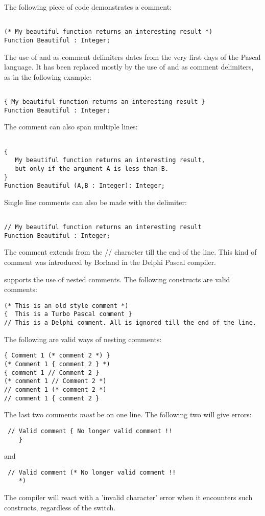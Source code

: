 The following piece of code demonstrates a comment:
\begin{verbatim}

(* My beautiful function returns an interesting result *) 
Function Beautiful : Integer;

\end{verbatim}
The use of \var{(*} and \var{*)} as comment delimiters dates from the very 
first days of the Pascal language. It has been replaced mostly by the
use of \var{\{} and \var{\}} as comment delimiters, as in the following
example:
\begin{verbatim}

{ My beautiful function returns an interesting result }
Function Beautiful : Integer;

\end{verbatim}
The comment can also span multiple lines:
\begin{verbatim}

{
   My beautiful function returns an interesting result,
   but only if the argument A is less than B.
}
Function Beautiful (A,B : Integer): Integer;
\end{verbatim}
Single line comments can also be made with the \var{//} delimiter:
\begin{verbatim}

// My beautiful function returns an interesting result
Function Beautiful : Integer;

\end{verbatim}
The comment extends from the // character till the end of the line.
This kind of comment was introduced by Borland in the Delphi Pascal
compiler.

\fpc supports the use of nested comments. The following constructs are valid
comments:
\begin{verbatim}
(* This is an old style comment *)
{  This is a Turbo Pascal comment }
// This is a Delphi comment. All is ignored till the end of the line.
\end{verbatim}
The following are valid ways of nesting comments:
\begin{verbatim}
{ Comment 1 (* comment 2 *) }
(* Comment 1 { comment 2 } *)
{ comment 1 // Comment 2 }
(* comment 1 // Comment 2 *)
// comment 1 (* comment 2 *)
// comment 1 { comment 2 }
\end{verbatim}
The last two comments {\em must} be on one line. The following two will give
errors:
\begin{verbatim}
 // Valid comment { No longer valid comment !!
    }
\end{verbatim}
and
\begin{verbatim}
 // Valid comment (* No longer valid comment !!
    *)
\end{verbatim}
The compiler will react with a 'invalid character' error when it encounters
such constructs, regardless of the  switch.

